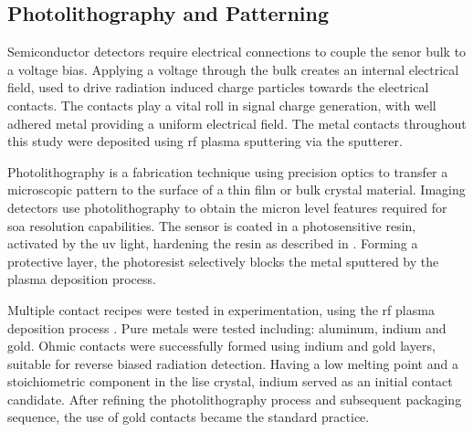 \documentclass[../../../main.tex]{subfiles}
\begin{document}
%
    \subsection{Photolithography and Patterning}%
    \label{sec:chapter-3:sensor-fabrication:photolithography}%
    Semiconductor detectors require electrical connections to couple the senor bulk to a voltage bias.
    Applying a voltage through the bulk creates an internal electrical field, used to drive radiation induced charge particles towards the electrical contacts.
    The contacts play a vital roll in signal charge generation, with well adhered metal providing a uniform electrical field.
    The metal contacts throughout this study were deposited using \gls{rf} plasma sputtering via the \gls{sputterer}.
    \par%
    Photolithography is a fabrication technique using precision optics to transfer a microscopic pattern to the surface of a thin film or bulk crystal material.
    Imaging detectors use photolithography to obtain the micron level features required for \gls{soa} resolution capabilities.
    The sensor is coated in a photosensitive resin, activated by the \gls{uv} light, hardening the resin as described in .
    Forming a protective layer, the photoresist selectively blocks the metal sputtered by the plasma deposition process.
    \par%
    Multiple contact recipes were tested in experimentation, using the \gls{rf} plasma deposition process \cite{Hamm_2015}.
    Pure metals were tested including: aluminum, indium and gold.
    Ohmic contacts were successfully formed using indium and gold layers, suitable for reverse biased radiation detection.
    Having a low melting point and a stoichiometric component in the \gls{lise} crystal, indium served as an initial contact candidate.
    After refining the photolithography process and subsequent packaging sequence, the use of gold contacts became the standard practice.
\end{document}
